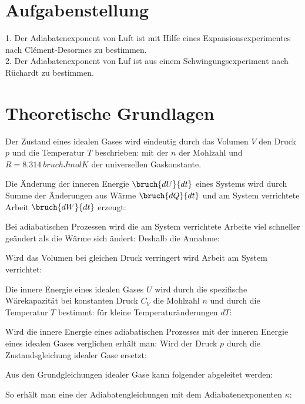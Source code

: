 \documentclass{protokoll}
\begin{document}
\section{Aufgabenstellung}
1. Der Adiabatenexponent von Luft ist mit Hilfe
eines Expansionsexperimentes nach 
Cl\'{e}ment-Desormes zu bestimmen.
\\
2. Der Adiabatenexponent von Luf ist aus einem
Schwingungsexperiment nach Rüchardt zu 
bestimmen.

\section{Theoretische Grundlagen}
Der Zustand eines idealen Gases wird eindeutig
durch das Volumen $V$ den Druck $p$ und die 
Temperatur $T$ beschrieben:
mit der $n$ der Mohlzahl und 
$R = 8.314 \ bruch{J}{mol K}$ der
universellen Gaskonstante.

Die Änderung der inneren Energie 
$\bruch{dU}{dt}$ eines
Systems wird durch Summe der Änderungen aus
Wärme $\bruch{dQ}{dt}$ und
am System verrichtete Arbeit $\bruch{dW}{dt}$
erzeugt:

Bei adiabatischen Prozessen wird die am 
System verrichtete Arbeite viel schneller 
geändert als die Wärme sich ändert:
Deshalb die Annahme:

Wird das Volumen bei gleichen Druck 
verringert wird Arbeit am System verrichtet:



Die innere Energie eines idealen Gases
$U$ wird durch die spezifische
Wärekapazität bei konstanten Druck $C_V$ die Mohlzahl 
$n$ und durch die Temperatur $T$ bestimmt:
für kleine Temperaturänderungen $dT$:

Wird die innere Energie eines adiabatischen Prozesses mit der inneren Energie
eines idealen Gases verglichen erhält man:
Wird der Druck $p$ durch die Zustandsgleichung idealer Gase ersetzt:

Aus den Grundgleichungen idealer Gase kann folgender abgeleitet werden:

So erhält man eine der Adiabatengleichungen mit dem Adiabatenexponenten $\kappa$:
\end{document}
